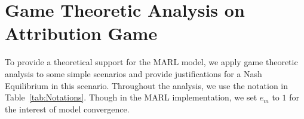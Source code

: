 \documentclass[a4paper,11pt]{article}
\begin{document}
    







\section{Game Theoretic Analysis on Attribution Game}\label{sec:game_analysis}
To provide a theoretical support for the MARL model, we apply game theoretic analysis to some simple scenarios and provide justifications for a Nash Equilibrium in this scenario. Throughout the analysis, we use the notation in Table~\ref{tab:Notations}. Though in the MARL implementation, we set \(e_m\) to \(1\) for the interest of model convergence.
\end{document}
